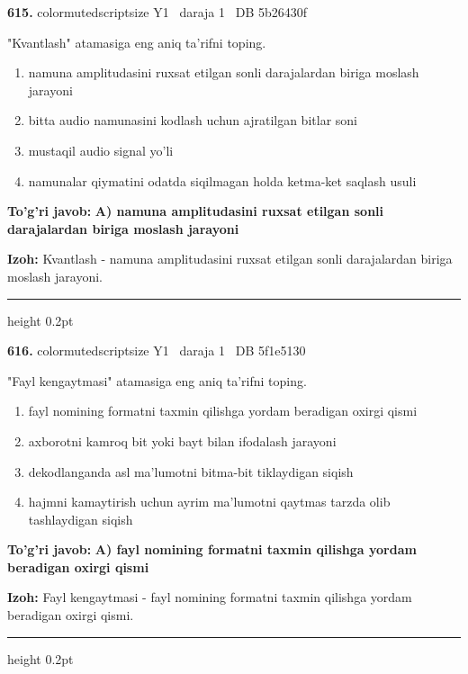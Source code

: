 \documentclass[10pt,a4paper,oneside]{article}
\begin{document}
\noindent\textbf{\color{ink}615.}  {color{muted}scriptsize Y1 \textbullet\ daraja 1 \textbullet\ DB 5b26430f}
\par
"Kvantlash" atamasiga eng aniq ta'rifni toping.
\begin{enumerate}[label=\Alph*),leftmargin=9mm]
\item namuna amplitudasini ruxsat etilgan sonli darajalardan biriga moslash jarayoni
\item bitta audio namunasini kodlash uchun ajratilgan bitlar soni
\item mustaqil audio signal yo'li
\item namunalar qiymatini odatda siqilmagan holda ketma-ket saqlash usuli
\end{enumerate}
\begin{tcolorbox}[enhanced,breakable,colback=teal!4,colframe=teal!50!black,boxrule=0.5pt,arc=1.1mm,left=3mm,right=3mm,top=1.7mm,bottom=1.7mm,before skip=2mm,after skip=2mm]
\textbf{\color{teal}To'g'ri javob:} \textbf{A) namuna amplitudasini ruxsat etilgan sonli darajalardan biriga moslash jarayoni}
\par\smallskip
\textbf{Izoh:} Kvantlash - namuna amplitudasini ruxsat etilgan sonli darajalardan biriga moslash jarayoni.
\end{tcolorbox}
\vspace{2mm}\hrule height 0.2pt \vspace{3mm}

\noindent\textbf{\color{ink}616.}  {color{muted}scriptsize Y1 \textbullet\ daraja 1 \textbullet\ DB 5f1e5130}
\par
"Fayl kengaytmasi" atamasiga eng aniq ta'rifni toping.
\begin{enumerate}[label=\Alph*),leftmargin=9mm]
\item fayl nomining formatni taxmin qilishga yordam beradigan oxirgi qismi
\item axborotni kamroq bit yoki bayt bilan ifodalash jarayoni
\item dekodlanganda asl ma'lumotni bitma-bit tiklaydigan siqish
\item hajmni kamaytirish uchun ayrim ma'lumotni qaytmas tarzda olib tashlaydigan siqish
\end{enumerate}
\begin{tcolorbox}[enhanced,breakable,colback=teal!4,colframe=teal!50!black,boxrule=0.5pt,arc=1.1mm,left=3mm,right=3mm,top=1.7mm,bottom=1.7mm,before skip=2mm,after skip=2mm]
\textbf{\color{teal}To'g'ri javob:} \textbf{A) fayl nomining formatni taxmin qilishga yordam beradigan oxirgi qismi}
\par\smallskip
\textbf{Izoh:} Fayl kengaytmasi - fayl nomining formatni taxmin qilishga yordam beradigan oxirgi qismi.
\end{tcolorbox}
\vspace{2mm}\hrule height 0.2pt \vspace{3mm}
\end{document}
